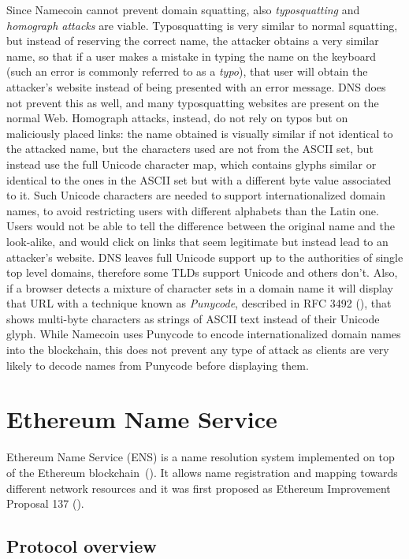 \documentclass[mscthesis]{usiinfthesis}
\begin{document}
Since Namecoin cannot prevent domain squatting, also \emph{typosquatting} and \emph{homograph attacks} are viable. Typosquatting is very similar to normal squatting, but instead of reserving the correct name, the attacker obtains a very similar name, so that if a user makes a mistake in typing the name on the keyboard (such an error is commonly referred to as a \emph{typo}), that user will obtain the attacker's website instead of being presented with an error message. DNS does not prevent this as well, and many typosquatting websites are present on the normal Web. Homograph attacks, instead, do not rely on typos but on maliciously placed links: the name obtained is visually similar if not identical to the attacked name, but the characters used are not from the ASCII set, but instead use the full Unicode character map, which contains glyphs similar or identical to the ones in the ASCII set but with a different byte value associated to it. Such Unicode characters are needed to support internationalized domain names, to avoid restricting users with different alphabets than the Latin one. Users would not be able to tell the difference between the original name and the look-alike, and would click on links that seem legitimate but instead lead to an attacker's website. DNS leaves full Unicode support up to the authorities of single top level domains, therefore some TLDs support Unicode and others don't. Also, if a browser detects a mixture of character sets in a domain name it will display that URL with a technique known as \emph{Punycode}, described in RFC 3492 (\cite{rfc:3492}), that shows multi-byte characters as strings of ASCII text instead of their Unicode glyph. While Namecoin uses Punycode to encode internationalized domain names into the blockchain, this does not prevent any type of attack as clients are very likely to decode names from Punycode before displaying them.%

\section{Ethereum Name Service}\label{proj:ens}

Ethereum Name Service (ENS) is a name resolution system implemented on top of the Ethereum blockchain~(\cite{wood2014ethereum}). It allows name registration and mapping towards different network resources and it was first proposed as Ethereum Improvement Proposal 137 (\cite{eip:137}).

\subsection{Protocol overview}
\end{document}
